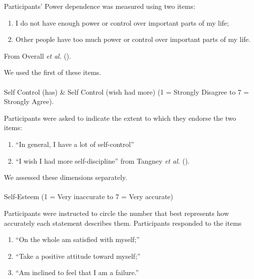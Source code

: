 \documentclass[
  single column]{article}
\makeatletter
\let\oldparagraph\paragraph
\renewcommand{\paragraph}{
    \@ifstar
      \xxxParagraphStar
      \xxxParagraphNoStar
  }
\newcommand{\xxxParagraphStar}[1]{\oldparagraph*{#1}\mbox{}}
\newcommand{\xxxParagraphNoStar}[1]{\oldparagraph{#1}\mbox{}}
\providecommand{\tightlist}{%
  \setlength{\itemsep}{0pt}\setlength{\parskip}{0pt}}\usepackage{longtable,booktabs,array}
\makeatother
\begin{document}
Participants' Power dependence was measured using two items:

\begin{enumerate}
\def\labelenumi{(\arabic{enumi})}
\tightlist
\item
  I do not have enough power or control over important parts of my life;
\item
  Other people have too much power or control over important parts of my
  life.
\end{enumerate}

From Overall \emph{et al.} ().

We used the first of these items.

\paragraph{Self Control (has) \& Self Control (wish had more) (1 =
Strongly Disagree to 7 = Strongly
Agree).}\label{self-control-has-self-control-wish-had-more-1-strongly-disagree-to-7-strongly-agree.}

Participants were asked to indicate the extent to which they endorse the
two items:

\begin{enumerate}
\def\labelenumi{\arabic{enumi}.}
\tightlist
\item
  ``In general, I have a lot of self-control''
\item
  ``I wish I had more self-discipline'' from Tangney \emph{et al.}
  ().
\end{enumerate}

We assessed these dimensions separately.

\paragraph{Self-Esteem (1 = Very inaccurate to 7 = Very
accurate)}\label{self-esteem-1-very-inaccurate-to-7-very-accurate}

Participants were instructed to circle the number that best represents
how accurately each statement describes them. Participants responded to
the items

\begin{enumerate}
\def\labelenumi{\arabic{enumi}.}
\tightlist
\item
  ``On the whole am satisfied with myself;''
\item
  ``Take a positive attitude toward myself;''
\item
  ``Am inclined to feel that I am a failure.''
\end{enumerate}
\end{document}
